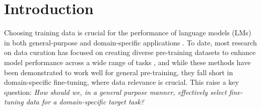 \section{Introduction}
\label{sec:introduction}

Choosing training data is crucial for the performance of language models (LMs) in both general-purpose and domain-specific applications \citep{brown2020languagemodelsfewshotlearners, dontstoppretrainingadapt, trainingcomputeoptimallargelanguage}. 
To date, most research on data curation has focused on creating diverse pre-training datasets to enhance model performance across a wide range of tasks \citep{sorscher2022beyond,dsir, d4, semdedup, doremi,lee2023beyond,wettig2024quratingselectinghighqualitydata,penedo2024finewebdatasetsdecantingweb,li2024datacomp,sachdeva2024train}, and while these methods have been demonstrated to work well for general pre-training, they fall short in domain-specific fine-tuning, where data relevance is crucial. This raise a key question: 
\textit{How should we, in a general purpose manner, effectively select fine-tuning data for a domain-specific target task?}


